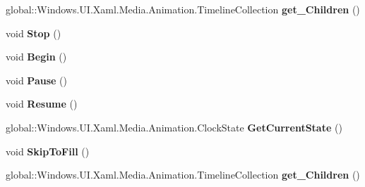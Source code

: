 \begin{DoxyCompactItemize}
global\+::\+Windows.\+U\+I.\+Xaml.\+Media.\+Animation.\+Timeline\+Collection {\bfseries get\+\_\+\+Children} ()
\item 
\mbox{\label{interface_windows_1_1_u_i_1_1_xaml_1_1_media_1_1_animation_1_1_i_storyboard_acdc53aada6a43b3d82536e1968449961}} 
void {\bfseries Stop} ()
\item 
\mbox{\label{interface_windows_1_1_u_i_1_1_xaml_1_1_media_1_1_animation_1_1_i_storyboard_acecbf19b19efcd680ab801ea7583213d}} 
void {\bfseries Begin} ()
\item 
\mbox{\label{interface_windows_1_1_u_i_1_1_xaml_1_1_media_1_1_animation_1_1_i_storyboard_ab6962da9d22e4e6074b1b55d16e501c6}} 
void {\bfseries Pause} ()
\item 
\mbox{\label{interface_windows_1_1_u_i_1_1_xaml_1_1_media_1_1_animation_1_1_i_storyboard_ac730df45ba536de8f998a9a99c6995d6}} 
void {\bfseries Resume} ()
\item 
\mbox{\label{interface_windows_1_1_u_i_1_1_xaml_1_1_media_1_1_animation_1_1_i_storyboard_a921af38756f68389523f29696421dc20}} 
global\+::\+Windows.\+U\+I.\+Xaml.\+Media.\+Animation.\+Clock\+State {\bfseries Get\+Current\+State} ()
\item 
\mbox{\label{interface_windows_1_1_u_i_1_1_xaml_1_1_media_1_1_animation_1_1_i_storyboard_a2e94db3f45b7a46b539a78a132a85d7e}} 
void {\bfseries Skip\+To\+Fill} ()
\item 
\mbox{\label{interface_windows_1_1_u_i_1_1_xaml_1_1_media_1_1_animation_1_1_i_storyboard_a4d9df632c9aa2afcb3d619dcbb357776}} 
global\+::\+Windows.\+U\+I.\+Xaml.\+Media.\+Animation.\+Timeline\+Collection {\bfseries get\+\_\+\+Children} ()
\item 
\mbox{\label{interface_windows_1_1_u_i_1_1_xaml_1_1_media_1_1_animation_1_1_i_storyboard_acdc53aada6a43b3d82536e1968449961}} 

\end{DoxyCompactItemize}
